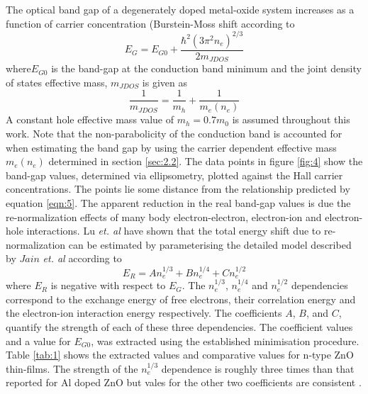 \documentclass[final,5p,times]{elsarticle}
\begin{document}
The optical band gap of a degenerately doped metal-oxide system increases as a function of carrier concentration (Burstein-Moss shift \cite{Burstein1954,Moss1954} according to
\begin{equation}
\label{eqn:5}
E_G = E_{G0} + \frac{\hbar^2(3\pi^2n_e)^{2/3}}{2m_{JDOS}}
\end{equation}
where$E_{G0}$ is the band-gap at the conduction band minimum and the joint density of states effective mass, $m_{JDOS}$ is given as
\begin{equation}
\label{eqn:6}
\frac{1}{m_{JDOS}} = \frac{1}{m_h}+\frac{1}{m_e(n_e)}
\end{equation}
A constant hole effective mass value of $m_h = 0.7m_0$ \cite{Beni1979, Reynolds1996} is assumed throughout this work. Note that the non-parabolicity of the conduction band is accounted for when estimating the band gap by using the carrier dependent effective mass $m_e(n_e)$ determined in section \ref{sec:2.2}. The data points in figure \ref{fig:4} show the band-gap values, determined via ellipsometry, plotted against the Hall carrier concentrations. The points lie some distance from the relationship predicted by equation \ref{eqn:5}. The apparent reduction in the real band-gap values is due the re-normalization effects of many body electron-electron, electron-ion and electron-hole interactions. Lu \textit{et. al} \cite{Lu2007} have shown that the total energy shift due to re-normalization can be estimated by parameterising the detailed model described by $Jain$ \textit{et. al} \cite{Jain1990, Jain1991} according to 
\begin{equation}
\label{eqn:7}
E_R = An_e^{1/3} + Bn_e^{1/4} + Cn_e^{1/2}
\end{equation}
where $E_R$ is negative with respect to $E_G$. The $n_e^{1/3}$, $n_e^{1/4}$ and $n_e^{1/2}$ dependencies correspond to the exchange energy of free electrons, their correlation energy and the electron-ion interaction energy respectively. The coefficients $A$, $B$, and $C$, quantify the strength of each of these three dependencies. The coefficient values and a value for $E_{G0}$, was extracted using the established minimisation procedure. Table \ref{tab:1} shows the extracted values and comparative values for n-type ZnO thin-films. The strength of the $n_e^{1/3}$ dependence is roughly three times than that reported for Al doped ZnO but vales for the other two coefficients are consistent \cite{Lu2007}.
\end{document}
